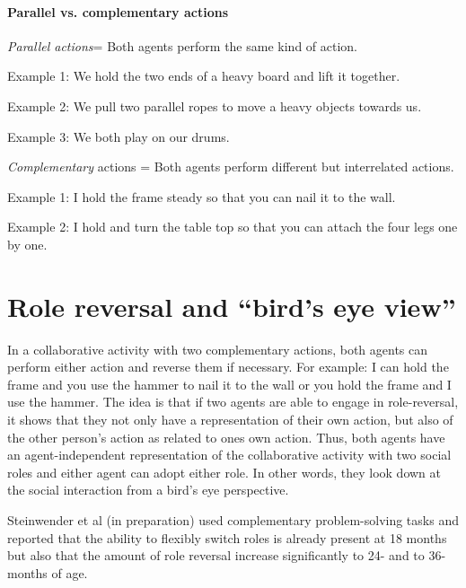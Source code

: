 \documentclass{article}
\begin{document}
\paragraph{Parallel vs. complementary actions}

\textit{Parallel actions}= Both agents perform the same kind of action.

Example 1: We hold the two ends of a heavy board and lift it together.

Example 2: We pull two parallel ropes to move a heavy objects towards us.

Example 3: We both play on our drums.

\textit{Complementary} actions = Both agents perform different but interrelated
actions.

Example 1: I hold the frame steady so that you can nail it to the wall.

Example 2: I hold and turn the table top so that you can attach the four legs
one by one.


\section{Role reversal and ``bird's eye view''}

In a collaborative activity with two complementary actions, both agents can
perform either action and reverse them if necessary. For example: I can hold
the frame and you use the hammer to nail it to the wall or you hold the frame
and I use the hammer. The idea is that if two agents are able to engage in
role-reversal, it shows that they not only have a representation of their own
action, but also of the other person's action as related to ones own action.
Thus, both agents have an agent-independent representation of the collaborative
activity with two social roles and either agent can adopt either role. In other
words, they look down at the social interaction from a bird's eye perspective.

Steinwender et al (in preparation) used complementary problem-solving tasks and
reported that the ability to flexibly switch roles is already present at 18
months but also that the amount of role reversal increase significantly to 24-
and  to 36-months of age.
\end{document}
